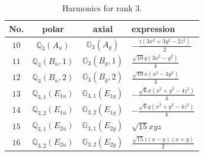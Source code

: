 \documentclass[fleqn,8pt,landscape]{jsarticle}
\begin{document}
\begin{table}[ht!]
\begin{center}
\caption{Harmonics for rank 3.}
\renewcommand{\arraystretch}{1.3}
\begin{tabular}{cccl} \hline \hline
No. & polar & axial & expression \\ \hline
$ 10 $ & $ \mathbb{Q}_{3}(A_{u}) $ & $ \mathbb{G}_{3}(A_{g}) $ & $ - \frac{z \left(3 x^{2} + 3 y^{2} - 2 z^{2}\right)}{2} $ \\
$ 11 $ & $ \mathbb{Q}_{3}(B_{u},1) $ & $ \mathbb{G}_{3}(B_{g},1) $ & $ \frac{\sqrt{10} y \left(3 x^{2} - y^{2}\right)}{4} $ \\
$ 12 $ & $ \mathbb{Q}_{3}(B_{u},2) $ & $ \mathbb{G}_{3}(B_{g},2) $ & $ \frac{\sqrt{10} x \left(x^{2} - 3 y^{2}\right)}{4} $ \\
$ 13 $ & $ \mathbb{Q}_{3,1}(E_{1u}) $ & $ \mathbb{G}_{3,1}(E_{1g}) $ & $ - \frac{\sqrt{6} x \left(x^{2} + y^{2} - 4 z^{2}\right)}{4} $ \\
$ 14 $ & $ \mathbb{Q}_{3,2}(E_{1u}) $ & $ \mathbb{G}_{3,2}(E_{1g}) $ & $ - \frac{\sqrt{6} y \left(x^{2} + y^{2} - 4 z^{2}\right)}{4} $ \\
$ 15 $ & $ \mathbb{Q}_{3,1}(E_{2u}) $ & $ \mathbb{G}_{3,1}(E_{2g}) $ & $ \sqrt{15} x y z $ \\
$ 16 $ & $ \mathbb{Q}_{3,2}(E_{2u}) $ & $ \mathbb{G}_{3,2}(E_{2g}) $ & $ \frac{\sqrt{15} z \left(x - y\right) \left(x + y\right)}{2} $ \\
 \hline \hline
\end{tabular}
\end{center}
\end{table}
\end{document}
